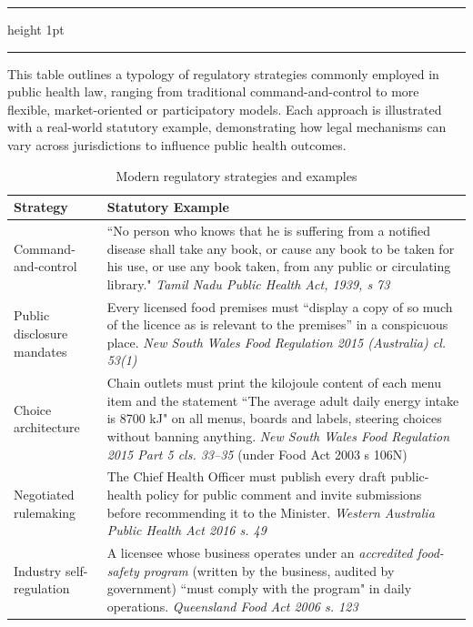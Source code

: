 \documentclass[a4paper,11pt]{article}
\newenvironment{floatintro}{\bigskip\footnotesize}{\bigskip}
\begin{document}
        \begin{table}[htbp]
        \hrule height 1pt\medskip
        \caption{Modern regulatory strategies and examples}
        \hrule

        \begin{floatintro}
        This table outlines a typology of regulatory strategies commonly employed in public health law, ranging from traditional command-and-control to more flexible, market-oriented or participatory models. Each approach is illustrated with a real-world statutory example, demonstrating how legal mechanisms can vary across jurisdictions to influence public health outcomes.
        \end{floatintro}
        \renewcommand{\arraystretch}{1.4} 
        \footnotesize\begin{center}
        \begin{tabular}{@{}p{4cm}p{8cm}@{}}
        \toprule
        Strategy & Statutory Example \\
        \midrule
        Command‐and‐control & ``No person who knows that he is suffering from a notified disease shall take any book, or cause any book to be taken for his use, or use any book taken, from any public or circulating library." \textit{Tamil Nadu Public Health Act, 1939, s 73}  \\

        Public disclosure mandates & Every licensed food premises must “display a copy of so much of the licence as is relevant to the premises” in a conspicuous place. \textit{New South Wales Food Regulation 2015 (Australia) cl. 53(1)} \\

        Choice architecture & Chain outlets must print the kilojoule content of each menu item and the statement ``The average adult daily energy intake is 8700 kJ" on all menus, boards and labels, steering choices without banning anything. \textit{New South Wales Food Regulation 2015 Part 5 cls. 33–35} (under Food Act 2003 s 106N) \\

        Negotiated rulemaking &  The Chief Health Officer must publish every draft public-health policy for public comment and invite submissions before recommending it to the Minister. \textit{Western Australia Public Health Act 2016 s. 49} \\

        Industry self-regulation &  A licensee whose business operates under an \emph{accredited food-safety program} (written by the business, audited by government) ``must comply with the program" in daily operations. \textit{Queensland Food Act 2006 s. 123} \\


\end{tabular}
\end{center}
\end{table}
\end{document}
